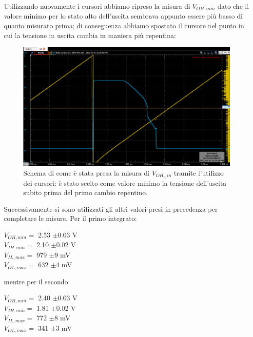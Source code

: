 \documentclass[10pt, a4paper, italian]{article}
\begin{document}
Utilizzando nuovamente i cursori abbiamo ripreso la misura di $V_{OH,min}$ dato che il valore minimo per lo stato alto dell'uscita sembrava appunto essere più basso di quanto misurato prima; di conseguenza abbiamo spostato il cursore nel punto in cui la tensione in uscita cambia in maniera più repentina:
\begin{figure}
	\includegraphics[scale=0.4]{trans1}
	\caption{Schema di come è stata presa la misura di $V_{OH_min}$ tramite l'utilizzo dei cursori: è stato scelto come valore minimo la tensione dell'uscita subito prima del primo cambio repentino.}
	\label{fig: trans1}
\end{figure}
Successivamente si sono utilizzati gli altri valori presi in precedenza per completare le misure.
Per il primo integrato:
\begin{multicols}{2}
    \centering
    $V_{OH,min}=$ 2.53 $\pm$0.03 V\\
    $V_{IH,min}=$ 2.10 $\pm$0.02 V\\
    
    $V_{IL,max}=$ 979 $\pm$9 mV\\
    $V_{OL,max}=$ 632 $\pm$4 mV\\
\end{multicols}
mentre per il secondo:

\begin{multicols}{2}
    \centering
    $V_{OH,min}=$ 2.40 $\pm$0.03 V\\
    $V_{IH,min}=$ 1.81 $\pm$0.02 V\\
    
    $V_{IL,max}=$ 772 $\pm$8 mV\\
    $V_{OL,max}=$ 341 $\pm$3 mV\\
\end{multicols}
\end{document}
